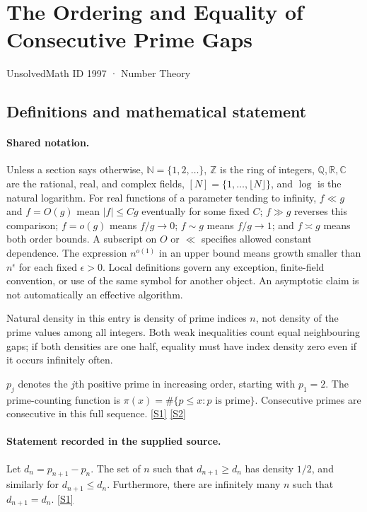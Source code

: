 \documentclass[11pt,a4paper]{article}
\newcommand{\N}{\mathbb{N}}
\newcommand{\Z}{\mathbb{Z}}
\newcommand{\Q}{\mathbb{Q}}
\newcommand{\R}{\mathbb{R}}
\newcommand{\C}{\mathbb{C}}
\newcommand{\sref}[2]{\hyperlink{source:#1:#2}{[S#2]}}
\begin{document}

\setcounter{section}{1996}

\section{The Ordering and Equality of Consecutive Prime Gaps}\label{1997}

{\small\sffamily UnsolvedMath ID 1997 · Number Theory}

\subsection{Definitions and mathematical statement}

\paragraph{Shared notation.}Unless a section says otherwise, $\N=\{1,2,\ldots\}$,
$\Z$ is the ring of integers, $\Q,\R,\C$ are the rational, real, and complex
fields, $[N]=\{1,\ldots,\lfloor N\rfloor\}$, and $\log$ is the natural
logarithm. For real functions of a parameter tending to infinity,
$f\ll g$ and $f=O(g)$ mean $|f|\leq Cg$ eventually for some fixed $C$;
$f\gg g$ reverses this comparison; $f=o(g)$ means $f/g\to0$;
$f\sim g$ means $f/g\to1$; and $f\asymp g$ means both order bounds.
A subscript on $O$ or $\ll$ specifies allowed constant dependence.
The expression $n^{o(1)}$ in an upper bound means growth smaller than
$n^\epsilon$ for each fixed $\epsilon>0$. Local definitions govern any
exception, finite-field convention, or use of the same symbol for another
object. An asymptotic claim is not automatically an effective algorithm.



Natural density in this entry is density of prime indices $n$, not density of the prime values among all integers. Both weak inequalities count equal neighbouring gaps; if both densities are one half, equality must have index density zero even if it occurs infinitely often.

$p_j$ denotes the $j$th positive prime in increasing order, starting with $p_1=2$. The prime-counting function is $\pi(x)=\#\{p\leq x:p\text{ is prime}\}$. Consecutive primes are consecutive in this full sequence. \sref{1997}{1} \sref{1997}{2}

\paragraph{Statement recorded in the supplied source.}
Let $d_n=p_{n+1}-p_n$. The set of $n$ such that $d_{n+1}\geq d_n$ has density $1/2$, and similarly for $d_{n+1}\leq d_n$. Furthermore, there are infinitely many $n$ such that $d_{n+1}=d_n$. \sref{1997}{1}
\end{document}
